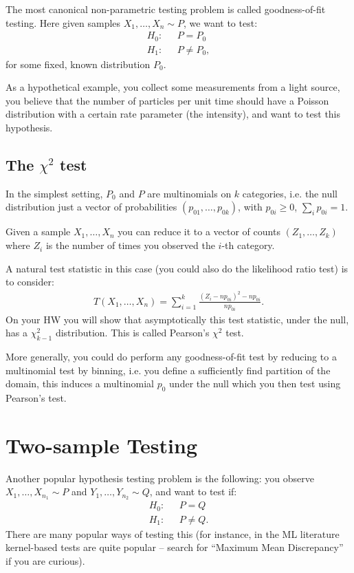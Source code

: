 \documentclass[twoside,12pt]{article}
\begin{document}
The most canonical non-parametric testing problem is called goodness-of-fit testing. Here given samples $X_1,\ldots,X_n \sim P$, we want to test:
\begin{align*}
H_0: &~~~P = P_0 \\
H_1: &~~~P \neq P_0,
\end{align*}
for some fixed, known distribution $P_0$. 

As a hypothetical example, you collect some measurements from a light source, you believe that the number of particles per unit time should have a Poisson distribution with a certain rate parameter (the intensity), and want to test this hypothesis.

\subsection{The $\chi^2$ test}
In the simplest setting, $P_0$ and $P$ are multinomials on $k$ categories, i.e. the null distribution just a vector of probabilities $(p_{01},\ldots,p_{0k})$, with $p_{0i} \geq 0$, $\sum_i p_{0i} = 1$.

Given a sample $X_1,\ldots,X_n$ you can reduce it to a vector of counts $(Z_1,\ldots,Z_k)$ where $Z_i$ is the number of times you observed the $i$-th category.

A natural test statistic in this case (you could also do the likelihood ratio test) is to consider:
\begin{align*}
T(X_1,\ldots,X_n) = \sum_{i=1}^k \frac{(Z_i - np_{0i})^2 - np_{0i}}{ np_{0i}}. 
\end{align*}
On your HW you will show that asymptotically this test statistic, under the null, has a $\chi^2_{k-1}$ distribution. 
This is called Pearson's $\chi^2$ test.

More generally, you could do perform any goodness-of-fit test by reducing to a multinomial test by binning, i.e. you define a sufficiently find partition of the domain, this induces a multinomial $p_0$ under the null which you then test using Pearson's test.

\section{Two-sample Testing}
Another popular hypothesis testing problem is the following: you observe $X_1,\ldots,X_{n_1} \sim P$ and $Y_1,\ldots,Y_{n_2} \sim Q$, and want to test if:
\begin{align*}
H_0: &~~~P = Q \\
H_1: &~~~P \neq Q.
\end{align*}
There are many popular ways of testing this (for instance, in the ML literature kernel-based tests are quite popular -- search for ``Maximum Mean Discrepancy'' if you are curious).
\end{document}
